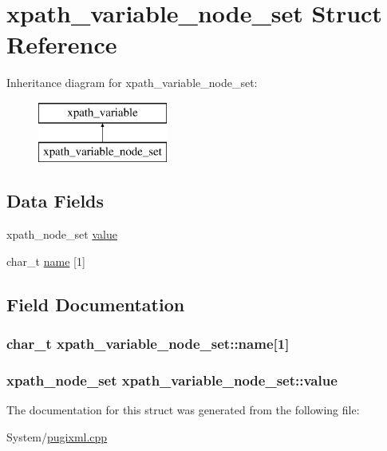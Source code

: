 \hypertarget{structxpath__variable__node__set}{\section{xpath\-\_\-variable\-\_\-node\-\_\-set Struct Reference}
\label{structxpath__variable__node__set}
}
Inheritance diagram for xpath\-\_\-variable\-\_\-node\-\_\-set\-:\begin{figure}[H]
\begin{center}
\leavevmode
\includegraphics[height=2.000000cm]{structxpath__variable__node__set}
\end{center}
\end{figure}
\subsection*{Data Fields}
\begin{DoxyCompactItemize}
\item 
xpath\-\_\-node\-\_\-set \hyperlink{structxpath__variable__node__set_a830ac0dbcaf5f8ff3373d10273e72bf4}{value}
\item 
char\-\_\-t \hyperlink{structxpath__variable__node__set_a9a6a40cea40764364adb3ddba2e7a2ff}{name} \mbox{[}1\mbox{]}
\end{DoxyCompactItemize}


\subsection{Field Documentation}
\hypertarget{structxpath__variable__node__set_a9a6a40cea40764364adb3ddba2e7a2ff}{
\subsubsection[{name}]{\setlength{\rightskip}{0pt plus 5cm}char\-\_\-t xpath\-\_\-variable\-\_\-node\-\_\-set\-::name\mbox{[}1\mbox{]}}}\label{structxpath__variable__node__set_a9a6a40cea40764364adb3ddba2e7a2ff}
\hypertarget{structxpath__variable__node__set_a830ac0dbcaf5f8ff3373d10273e72bf4}{
\subsubsection[{value}]{\setlength{\rightskip}{0pt plus 5cm}xpath\-\_\-node\-\_\-set xpath\-\_\-variable\-\_\-node\-\_\-set\-::value}}\label{structxpath__variable__node__set_a830ac0dbcaf5f8ff3373d10273e72bf4}


The documentation for this struct was generated from the following file\-:\begin{DoxyCompactItemize}
\item 
System/\hyperlink{pugixml_8cpp}{pugixml.\-cpp}\end{DoxyCompactItemize}
